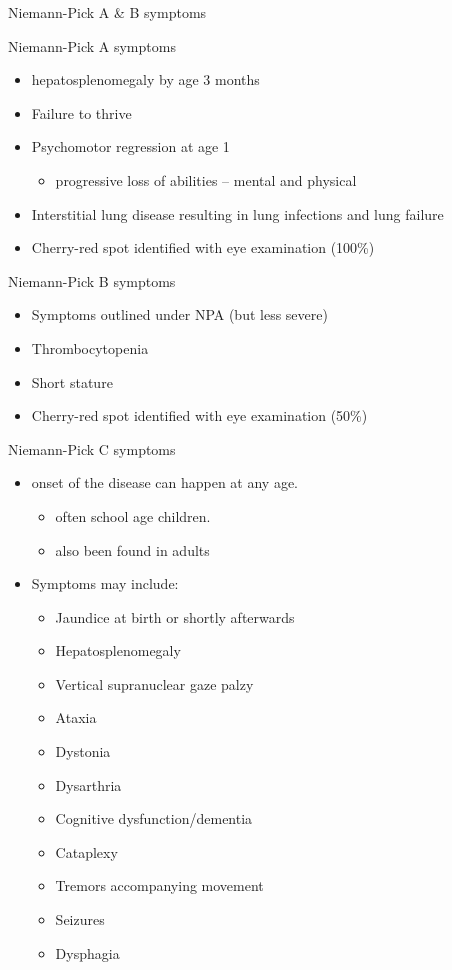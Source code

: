 \documentclass[presentation, smaller]{beamer}
\begin{document}
\begin{frame}[label={sec:orgheadline11}]{Niemann-Pick A \& B symptoms}
\begin{block}{Niemann-Pick A symptoms}
\begin{itemize}
\item hepatosplenomegaly by age 3 months
\item Failure to thrive
\item Psychomotor regression at age 1
\begin{itemize}
\item progressive loss of abilities – mental and physical
\end{itemize}
\item Interstitial lung disease resulting in lung infections and lung failure
\item Cherry-red spot identified with eye examination (100\%)
\end{itemize}
\end{block}

\begin{block}{Niemann-Pick B symptoms}
\begin{itemize}
\item Symptoms outlined under NPA (but less severe)
\item Thrombocytopenia
\item Short stature
\item Cherry-red spot identified with eye examination (50\%)
\end{itemize}
\end{block}
\end{frame}

\begin{frame}[label={sec:orgheadline12}]{Niemann-Pick C symptoms}
\begin{itemize}
\item onset of the disease can happen at any age.
\begin{itemize}
\item often school age children.
\item also been found in adults
\end{itemize}

\item Symptoms may include:
\begin{itemize}
\item Jaundice at birth or shortly afterwards
\item Hepatosplenomegaly
\item Vertical supranuclear gaze palzy
\item Ataxia
\item Dystonia
\item Dysarthria
\item Cognitive dysfunction/dementia
\item Cataplexy
\item Tremors accompanying movement
\item Seizures
\item Dysphagia
\end{itemize}
\end{itemize}
\end{frame}
\end{document}
